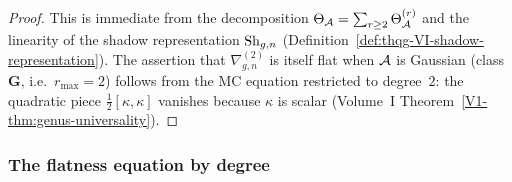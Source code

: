 \begin{proof}
This is immediate from the decomposition
$\Theta_{\mathcal{A}} = \sum_{r \geq 2} \Theta_{\mathcal{A}}^{(r)}$
and the linearity of the shadow representation
$\operatorname{Sh}_{g,n}$ (Definition~\ref{def:thqg-VI-shadow-representation}).
The assertion that $\nabla^{(2)}_{g,n}$ is itself flat when
$\mathcal{A}$ is Gaussian (class~$\mathbf{G}$, i.e.~$r_{\max} = 2$) follows
from the MC equation restricted to degree~$2$: the quadratic piece
$\tfrac{1}{2}[\kappa,\kappa]$ vanishes because $\kappa$ is scalar
(Volume~I Theorem~\ref{V1-thm:genus-universality}).
\end{proof}

\subsubsection{The flatness equation by degree}

